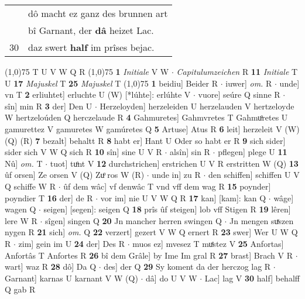 \documentclass[8pt,a4paper,notitlepage]{article}
\begin{document}
\begin{table}[ht]
\begin{minipage}[t]{0.5\linewidth}
\begin{tabular}{rl}
 & dô macht ez ganz des brunnen art\\ 
 & bî Garnant, der \textbf{dâ} heizet Lac.\\ 
30 & daz swert \textbf{half} im prîses bejac.\\ 
\end{tabular}
\scriptsize
\line(1,0){75} \newline
T U V W Q R \newline
\line(1,0){75} \newline
\textbf{1} \textit{Initiale} V W   $\cdot$ \textit{Capitulumzeichen} R  \textbf{11} \textit{Initiale} T U  \textbf{17} \textit{Majuskel} T  \textbf{25} \textit{Majuskel} T  \newline
\line(1,0){75} \newline
\textbf{1} beidiu] Beider R  $\cdot$ iuwer] \textit{om.} R  $\cdot$ unde] vn T \textbf{2} erliuhtet] erluchte U (W) [*lúhte]: erlúhte  V  $\cdot$ vuore] seúre Q sinne R  $\cdot$ sîn] min R \textbf{3} der] Den U  $\cdot$ Herzeloyden] herzeleiden U herzelauden V hertzeloyde W hertzeloúden Q herczelaude R \textbf{4} Gahmuretes] Gahmvretes T Gahmuͦretes U gamurettez V gamuretes W gamúretes Q \textbf{5} Artuse] Atus R \textbf{6} leit] herzeleit V (W) (Q) (R) \textbf{7} bezalt] behaltt R \textbf{8} habt er] Hant U Oder so habt er R \textbf{9} sich sider] sider sich V W Q sich R \textbf{10} sîn] sine U V R  $\cdot$ alsîn] sin R  $\cdot$ pflegen] plege U \textbf{11} Nû] \textit{om.} T  $\cdot$ tuot] tuͦnt V \textbf{12} durchstrichen] erstrichen U V R erstritten W (Q) \textbf{13} ûf orsen] Ze orsen V (Q) Zuͦ ros W (R)  $\cdot$ unde in] zu R  $\cdot$ den schiffen] schiffen U V Q schiffe W R  $\cdot$ ûf dem wâc] vf denwâc T vnd vff dem wag R \textbf{15} poynder] poyndier T \textbf{16} der] de R  $\cdot$ vor im] nie U V W Q R \textbf{17} kan] [kam]: kan Q  $\cdot$ wâge] wagen Q  $\cdot$ seigen] [segen]: seigen Q \textbf{18} prîs ûf steigen] lob vff Stigen R \textbf{19} lêren] lere W R  $\cdot$ sîgen] singen Q \textbf{20} Jn mancher herren swingen Q  $\cdot$ Jn mengen suͯszen nygen R \textbf{21} sich] \textit{om.} Q \textbf{22} verzert] gezert V W Q ernert R \textbf{23} swer] Wer U W Q R  $\cdot$ zim] gein im U \textbf{24} der] Des R  $\cdot$ muos ez] mvesez T muͤstez V \textbf{25} Anfortas] Anfortâs T Anfortes R \textbf{26} bî dem Grâle] by Ime Im gral R \textbf{27} brast] Brach V R  $\cdot$ wart] waz R \textbf{28} dô] Da Q  $\cdot$ des] der Q \textbf{29} Sy koment da der herczog lag R  $\cdot$ Garnant] karnas U karnant V W (Q)  $\cdot$ dâ] do U V W  $\cdot$ Lac] lag V \textbf{30} half] behalff Q gab R \newline
\end{minipage}
\end{table}
\end{document}
